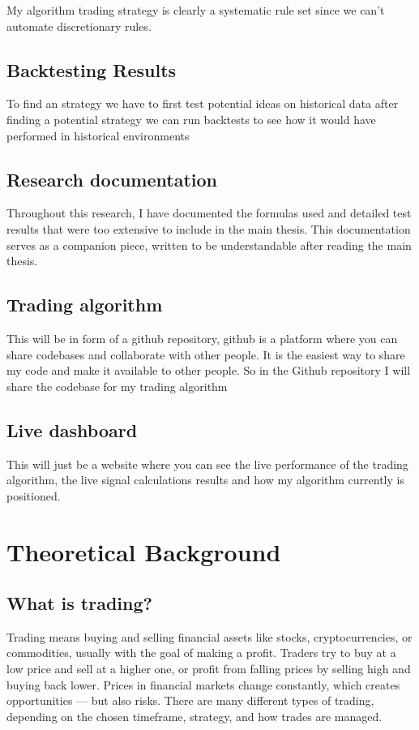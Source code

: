 \documentclass[12pt]{article}
\begin{document}
My algorithm trading strategy is clearly a systematic rule set since we can't automate discretionary rules.

\subsection{Backtesting Results}
To find an strategy we have to first test potential ideas on historical data after finding a potential strategy we can run backtests to see how it would have performed in historical environments




\subsection{Research documentation}
Throughout this research, I have documented the formulas used and detailed test results that were too extensive to include in the main thesis. This documentation serves as a companion piece, written to be understandable after reading the main thesis.


\subsection{Trading algorithm}
This will be in form of a github repository, github is a platform where you can share codebases and collaborate with other people.
It is the easiest way to share my code and make it available to other people. So in the Github repository I will share the codebase for my trading algorithm


\subsection{Live dashboard}
This will just be a website where you can see the live performance of the trading algorithm, the live signal calculations results and how my algorithm currently is positioned.



\newpage

\section{Theoretical Background}
\subsection*{What is trading?}
Trading means buying and selling financial assets like stocks, cryptocurrencies, or commodities, usually with the goal of making a profit. Traders try to buy at a low price and sell at a higher one, or profit from falling prices by selling high and buying back lower. Prices in financial markets change constantly, which creates opportunities — but also risks. There are many different types of trading, depending on the chosen timeframe, strategy, and how trades are managed.
\end{document}
